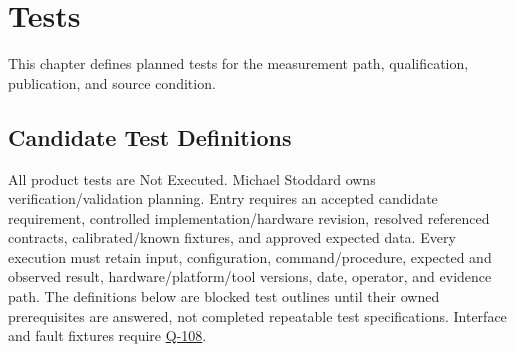\chapter{Tests}
\label{Section:TestsResponsibility}
This chapter defines planned tests for the measurement path, qualification, publication, and source condition.


\section{Candidate Test Definitions}
All product tests are Not Executed. Michael Stoddard owns verification/validation planning. Entry requires an accepted candidate requirement, controlled implementation/hardware revision, resolved referenced contracts, calibrated/known fixtures, and approved expected data. Every execution must retain input, configuration, command/procedure, expected and observed result, hardware/platform/tool versions, date, operator, and evidence path. The definitions below are blocked test outlines until their owned prerequisites are answered, not completed repeatable test specifications. Interface and fault fixtures require \hyperref[Question:Q-108]{Q-108}.

